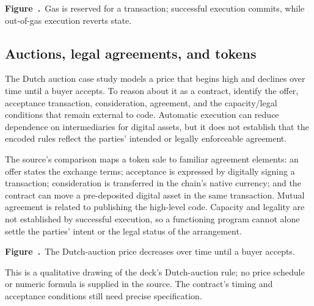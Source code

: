 \documentclass[11pt,a4paper]{article}
\numberwithin{figure}{section}
\newcommand{\diagramcaption}[1]{\par\smallskip\refstepcounter{figure}\begin{center}\small\textbf{Figure~\thefigure.}~#1\end{center}}
\begin{document}
\begin{center}\end{center}
\diagramcaption{Gas is reserved for a transaction; successful execution commits, while out-of-gas execution reverts state.}

\subsection{Auctions, legal agreements, and tokens}
The Dutch auction case study models a price that begins high and declines over time until a buyer accepts. To reason about it as a contract, identify the offer, acceptance transaction, consideration, agreement, and the capacity/legal conditions that remain external to code. Automatic execution can reduce dependence on intermediaries for digital assets, but it does not establish that the encoded rules reflect the parties' intended or legally enforceable agreement.

The source's comparison maps a token sale to familiar agreement elements: an offer states the exchange terms; acceptance is expressed by digitally signing a transaction; consideration is transferred in the chain's native currency; and the contract can move a pre-deposited digital asset in the same transaction. Mutual agreement is related to publishing the high-level code. Capacity and legality are not established by successful execution, so a functioning program cannot alone settle the parties' intent or the legal status of the arrangement.

\begin{center}\end{center}
\diagramcaption{The Dutch-auction price decreases over time until a buyer accepts.}
This is a qualitative drawing of the deck's Dutch-auction rule; no price schedule or numeric formula is supplied in the source. The contract's timing and acceptance conditions still need precise specification.
\end{document}
